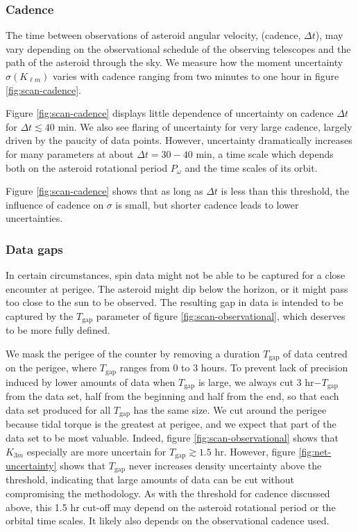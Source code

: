\documentclass[fleqn,usenatbib]{mnras}
\begin{document}
\subsubsection{Cadence}
\label{sec:scan-cadence}

The time between observations of asteroid angular velocity, (cadence, $\Delta t$), may vary depending on the observational schedule of the observing telescopes and the path of the asteroid through the sky.  We measure how the moment uncertainty $\sigma(K_{\ell m})$ varies with cadence ranging from two minutes to one hour in figure \ref{fig:scan-cadence}.

Figure \ref{fig:scan-cadence} displays little dependence of uncertainty on cadence $\Delta t$ for $\Delta t \lesssim 40$ min. We also see flaring of uncertainty for very large cadence, largely driven by the paucity of data points. However, uncertainty dramatically increases for many parameters at about $\Delta t = 30-40$ min, a time scale which depends both on the asteroid rotational period $P_\omega$ and the time scales of its orbit.

Figure \ref{fig:scan-cadence} shows that as long as $\Delta t$ is less than this threshold, the influence of cadence on $\sigma$ is small, but shorter cadence leads to lower uncertainties.

\subsubsection{Data gaps}
\label{sec:scan-gap}
In certain circumstances, spin data might not be able to be captured for a close encounter at perigee. The asteroid might dip below the horizon, or it might pass too close to the sun to be observed. The resulting gap in data is intended to be captured by the $T_\text{gap}$ parameter of figure \ref{fig:scan-observational}, which deserves to be more fully defined.

We mask the perigee of the counter by removing a duration $T_\text{gap}$ of data centred on the perigee, where $T_\text{gap}$ ranges from 0 to 3 hours. To prevent lack of precision induced by lower amounts of data when $T_\text{gap}$ is large, we always cut 3 hr$-T_\text{gap}$ from the data set, half from the beginning and half from the end, so that each data set produced for all $T_\text{gap}$ has the same size. We cut around the perigee because tidal torque is the greatest at perigee, and we expect that part of the data set to be most valuable. Indeed, figure \ref{fig:scan-observational} shows that $K_{3m}$ especially are more uncertain for $T_\text{gap} \gtrsim 1.5$ hr. However, figure \ref{fig:net-uncertainty} shows that $T_\text{gap}$ never increases density uncertainty above the threshold, indicating that large amounts of data can be cut without compromising the methodology. As with the threshold for cadence discussed above, this 1.5 hr cut-off may depend on the asteroid rotational period or the orbital time scales. It likely also depends on the observational cadence used.
\end{document}
